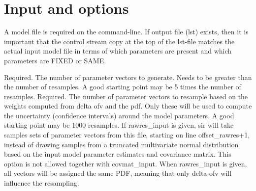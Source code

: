 \section{Input and options}
A model file is required on the command-line. 
If output file (lst) exists, then it is important that the control stream copy at the top of the lst-file matches the actual input model file
in terms of which parameters are present and which parameters are FIXED or SAME.
\begin{optionlist}
Required. The number of parameter vectors to generate. Needs to be greater than the number of resamples. A good starting point may be 5 times the number of resamples.
\nextopt
{}
Required. The number of parameter vectors to resample based on the weights
computed from delta ofv and the pdf. Only these will be used to compute the uncertainty (confidence intervals) around the model parameters. A good starting point may be 1000 resamples.
\nextopt
{}
If rawres\_input is given, sir will take samples sets of parameter
vectors from this file, starting on line offset\_rawres+1, instead of
drawing samples from a truncated multivariate normal distribution 
based on the input model parameter estimates and 
covariance matrix.
This option is not allowed together with covmat\_input. 
When rawres\_input is given, all vectors will be assigned the same PDF, meaning that only delta-ofv will influence the resampling.


\end{optionlist}
